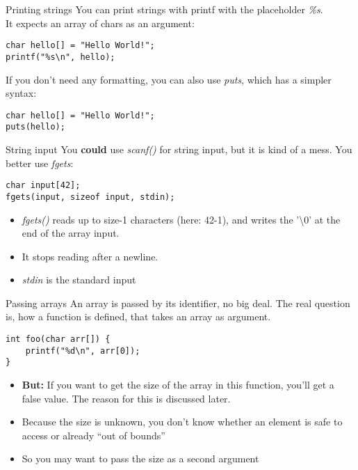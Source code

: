 \begin{frame}[fragile]{Printing strings}
	You can print strings with printf with the placeholder \textit{\%s}.\\
	It expects an array of chars as an argument:\bigskip
	\begin{lstlisting}[numbers=none]
char hello[] = "Hello World!";
printf("%s\n", hello);
\end{lstlisting}
	\bigskip
	If you don't need any formatting, you can also use \textit{puts}, which has a simpler syntax:
	\begin{lstlisting}[numbers=none]
char hello[] = "Hello World!";
puts(hello);
\end{lstlisting}
\end{frame}

\begin{frame}[fragile]{String input}
	You \textbf{could} use \textit{scanf()} for string input, but it is kind of a mess. You better use \textit{fgets}:
	\begin{lstlisting}[numbers=none]
char input[42];
fgets(input, sizeof input, stdin);
\end{lstlisting}
	\begin{itemize}
		\item \textit{fgets()} reads up to size-1 characters (here: 42-1), and writes the '\textbackslash0' at the end of the array input.
		\item It stops reading after a newline.
		\item \textit{stdin} is the standard input
	\end{itemize}
\end{frame}
\begin{frame}[fragile]{Passing arrays}
	An array is passed by its identifier, no big deal. The real question is, how a function is defined, that takes an array as argument.
	\begin{lstlisting}[numbers=none]
int foo(char arr[]) {
	printf("%d\n", arr[0]);
}
\end{lstlisting}
	\begin{itemize}
		\item \textbf{But:} If you want to get the size of the array in this function, you'll get a false value. The reason for this is discussed later.
		\item Because the size is unknown, you don't know whether an element is safe to access or already ``out of bounds''
		\item So you may want to pass the size as a second argument
	\end{itemize}
\end{frame}
